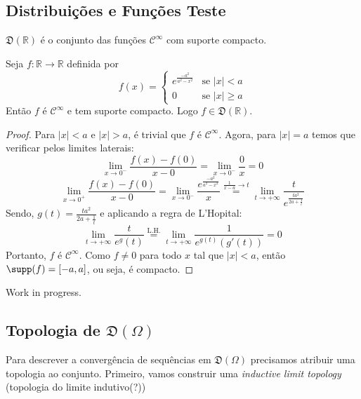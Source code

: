 \chapter{}

\section{Distribuições e Funções Teste}
\begin{definition}
    $\mathfrak{D}(\mathbb{R})$ é o conjunto das funções $\mathcal{C}^\infty$ com suporte compacto.
\end{definition}

\begin{lemma}
    Seja $f:\mathbb{R}\to\mathbb{R}$ definida por
    \[f(x) = \begin{cases}
        e^{\frac{-a^2}{a^2-x^2}} & \text{se } |x|<a\\
        0 & \text{se } |x|\geq a
    \end{cases}\]
    Então $f$ é $\mathcal{C}^\infty$ e tem suporte compacto. Logo $f\in\mathfrak{D}(\mathbb{R})$.
\end{lemma}
\begin{proof}
    Para $|x|<a$ e $|x|>a$, é trivial que $f$ é $\mathcal{C}^\infty$. Agora, para $|x|=a$ temos que verificar pelos limites laterais:
    \[\lim_{x \to 0^-}{\frac{f(x)-f(0)}{x-0}}=\lim_{x \to 0^-}{\frac{0}{x}}=0\] 
    \[\lim_{x \to 0^+}{\frac{f(x)-f(0)}{x-0}}=\lim_{x \to 0^-}{\frac{e^{\frac{-a^2}{a^2-x^2}}}{x}}\stackrel{\frac{1}{x-a}\to t}{=}\lim_{t \to+\infty}{\frac{t}{e^\frac{ta^2}{2a+\frac{1}{t}}}}\] 
    Sendo, $g(t)=\frac{ta^2}{2a+\frac{1}{t}}$ e aplicando a regra de L'Hopital:
    \[\lim_{t \to+\infty}{\frac{t}{e^g(t)}}\stackrel{\text{L.H.}}{=}\lim_{t \to+\infty}{\frac{1}{e^{g(t)}(g'(t))}=0}\] 
    Portanto, $f$ é $\mathcal{C}^\infty$. Como $f\neq0$ para todo $x$ tal que $|x|<a$, então $\supp(f)=[-a,a]$, ou seja, é compacto.  
\end{proof}

Work in progress.

\section{Topologia de $\mathfrak{D}(\Omega)$}  

Para descrever a convergência de sequências em $\mathfrak{D}(\Omega)$ precisamos atribuir uma topologia ao conjunto. Primeiro, vamos construir uma \textit{inductive limit topology} (topologia do limite indutivo(?))

